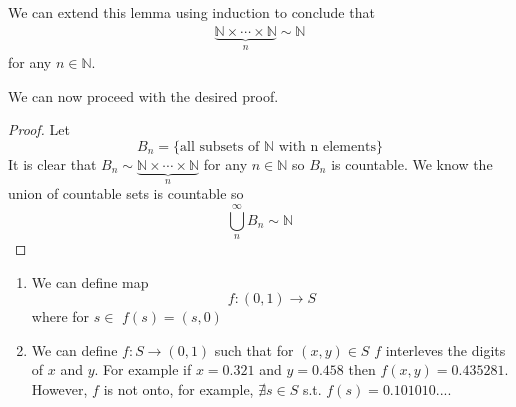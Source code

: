We can extend this lemma using induction to conclude that
\begin{align*}
    \underbrace{\mathbb{N} \times \cdots \times \mathbb{N}}_n \sim \mathbb{N}
\end{align*}
for any $n \in \mathbb{N}$.

We can now proceed with the desired proof.
\begin{proof}
    Let
    \begin{equation*}
        B_n = \{ \text{all subsets of } \mathbb{N} \text{ with n elements} \}
    \end{equation*}
    It is clear that $B_n \sim \underbrace{\mathbb{N} \times \cdots \times \mathbb{N}}_n$
    for any $n \in \mathbb{N}$ so $B_n$ is countable. We know the union of countable sets is
    countable so 
    \begin{equation*}
        \bigcup_n^\infty B_n \sim \mathbb{N}
    \end{equation*}
\end{proof}

\begin{enumerate}[label=(\alph*)]
    \item 
    We can define map
    \begin{equation*}
        f : (0,1) \rightarrow S
    \end{equation*}
    where for $s\in $ $f(s) = (s,0)$

    \item 
    We can define $f:S \rightarrow (0,1)$ such that for $(x,y) \in S$ $f$ interleves the 
    digits of $x$ and $y$. For example if $x=0.321$ and $y=0.458$ then $f(x,y)=0.435281$.
    However, $f$ is not onto, for example, $\nexists s\in S$ s.t. $f(s)=0.101010...$.  
\end{enumerate}

